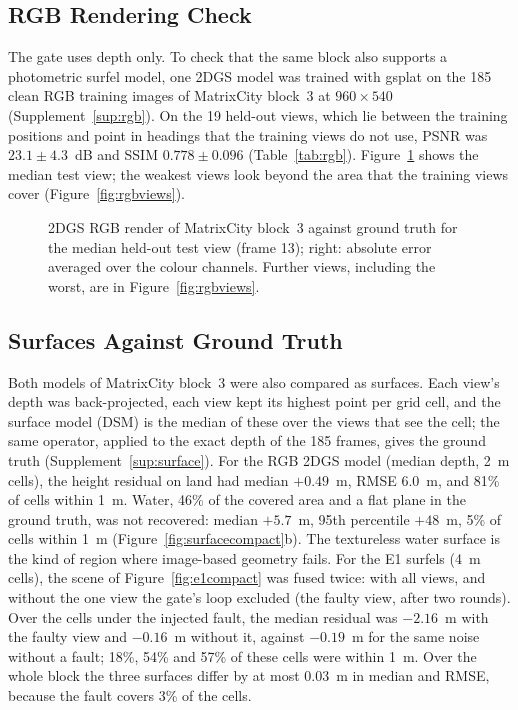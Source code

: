 \FloatBarrier

\subsection{RGB Rendering Check}
\label{sec:results:rgb}
The gate uses depth only. To check that the same block also supports a photometric surfel model, one
2DGS model was trained with gsplat on the 185 clean RGB training images of MatrixCity block~3 at
$960\times540$ (Supplement~\ref{sup:rgb}). On the 19 held-out views, which lie between the training
positions and point in headings that the training views do not use, PSNR was $23.1\pm4.3$~dB and SSIM
$0.778\pm0.096$ (Table~\ref{tab:rgb}). Figure~\ref{fig:rgbcompact} shows the median test view; the
weakest views look beyond the area that the training views cover (Figure~\ref{fig:rgbviews}).

\begin{figure}[!t]
\centering

\caption{2DGS RGB render of MatrixCity block~3 against ground truth for the median held-out test view
(frame 13); right: absolute error averaged over the colour channels. Further views, including the worst,
are in Figure~\ref{fig:rgbviews}.}
\label{fig:rgbcompact}
\end{figure}
\FloatBarrier

\subsection{Surfaces Against Ground Truth}
\label{sec:results:surface}
Both models of MatrixCity block~3 were also compared as surfaces. Each view's depth was back-projected,
each view kept its highest point per grid cell, and the surface model (DSM) is the median of these over
the views that see the cell; the same operator, applied to the exact depth of the 185 frames, gives the
ground truth (Supplement~\ref{sup:surface}). For the RGB 2DGS model (median depth, 2~m cells), the
height residual on land had median $+0.49$~m, RMSE 6.0~m, and 81\% of cells within 1~m. Water, 46\% of
the covered area and a flat plane in the ground truth, was not recovered: median $+5.7$~m, 95th percentile
$+48$~m, 5\% of cells within 1~m (Figure~\ref{fig:surfacecompact}b). The textureless water surface is the
kind of region where image-based geometry fails. For the E1 surfels (4~m cells), the scene of
Figure~\ref{fig:e1compact} was fused twice: with all views, and without the one view the gate's loop
excluded (the faulty view, after two rounds). Over the cells under the injected fault, the median
residual was $-2.16$~m with the faulty view and $-0.16$~m without it, against $-0.19$~m for the same
noise without a fault; 18\%, 54\% and 57\% of these cells were within 1~m. Over the whole block the three
surfaces differ by at most 0.03~m in median and RMSE, because the fault covers 3\% of the cells.

